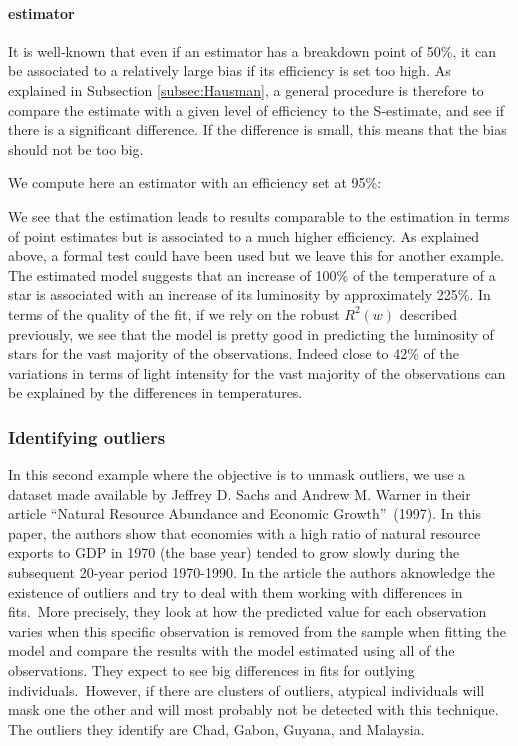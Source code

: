 \paragraph{ estimator}

It is well-known that even if an  estimator has a breakdown point of 50\%,
it can be associated to a relatively large bias if its efficiency is set too
high. As explained in Subsection \ref{subsec:Hausman}, a general procedure is
therefore to compare the  estimate with a given level of efficiency to the
S-estimate, and see if there is a significant difference. If the difference
is small, this means that the bias should not be too big.

We compute here an  estimator with an efficiency set at 95\%:


\begin{stlog}

\end{stlog}

We see that the  estimation leads to results comparable to the
 estimation in terms of point estimates but is associated to a much
higher efficiency. As explained above, a formal test could have been used but
we leave this for another example. The  estimated model suggests that
an increase of 100\% of the temperature of a star is associated with an
increase of its luminosity by approximately 225\%. In terms of the quality of
the fit, if we rely on the robust $R^2(w)$ described previously, we see that
the model is pretty good in predicting the luminosity of stars for the vast
majority of the observations. Indeed close to 42\% of the variations in terms
of light intensity for the vast majority of the observations can be explained
by the differences in temperatures.


\subsubsection{Identifying outliers} 

In this second example where the objective is
to unmask outliers, we use a dataset made available by Jeffrey D. Sachs and
Andrew M. Warner in their article \textquotedblleft Natural Resource Abundance
and Economic Growth\textquotedblright\ (1997). In this paper, the authors show
that economies with a high ratio of natural resource exports to GDP in 1970
(the base year) tended to grow slowly during the subsequent 20-year period
1970-1990. In the article the authors aknowledge the existence of outliers and
try to deal with them working with differences in fits.\ More precisely, they
look at how the predicted value for each observation varies when this specific
observation is removed from the sample when fitting the model and compare the
results with the model estimated using all of the observations. They expect to
see big differences in fits for outlying individuals.\ However, if there are
clusters of outliers, atypical individuals will mask one the other and will
most probably not be detected with this technique. The outliers they identify
are Chad, Gabon, Guyana, and Malaysia.

